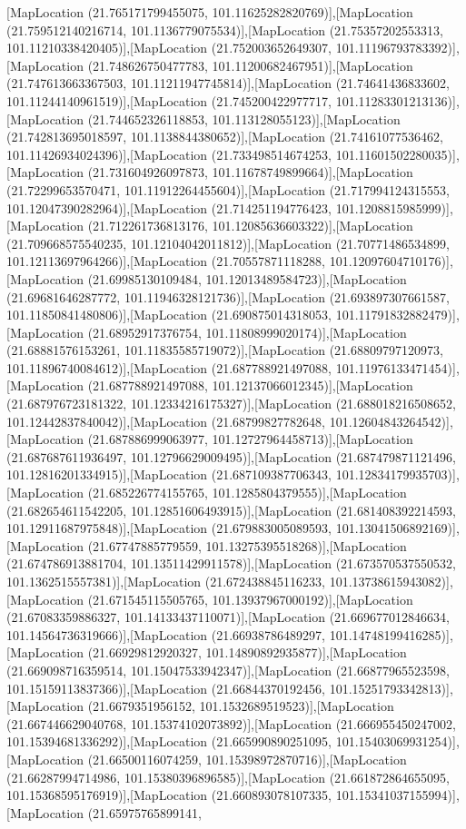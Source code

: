 [MapLocation (21.765171799455075, 101.11625282820769)],[MapLocation (21.759512140216714, 101.1136779075534)],[MapLocation (21.75357202553313, 101.11210338420405)],[MapLocation (21.752003652649307, 101.11196793783392)],[MapLocation (21.748626750477783, 101.11200682467951)],[MapLocation (21.747613663367503, 101.11211947745814)],[MapLocation (21.74641436833602, 101.11244140961519)],[MapLocation (21.745200422977717, 101.11283301213136)],[MapLocation (21.744652326118853, 101.113128055123)],[MapLocation (21.742813695018597, 101.1138844380652)],[MapLocation (21.74161077536462, 101.11426934024396)],[MapLocation (21.733498514674253, 101.11601502280035)],[MapLocation (21.731604926097873, 101.11678749899664)],[MapLocation (21.72299653570471, 101.11912264455604)],[MapLocation (21.717994124315553, 101.12047390282964)],[MapLocation (21.714251194776423, 101.1208815985999)],[MapLocation (21.712261736813176, 101.12085636603322)],[MapLocation (21.709668575540235, 101.12104042011812)],[MapLocation (21.70771486534899, 101.12113697964266)],[MapLocation (21.70557871118288, 101.12097604710176)],[MapLocation (21.69985130109484, 101.12013489584723)],[MapLocation (21.69681646287772, 101.11946328121736)],[MapLocation (21.693897307661587, 101.11850841480806)],[MapLocation (21.690875014318053, 101.11791832882479)],[MapLocation (21.68952917376754, 101.11808999020174)],[MapLocation (21.68881576153261, 101.11835585719072)],[MapLocation (21.68809797120973, 101.11896740084612)],[MapLocation (21.687788921497088, 101.11976133471454)],[MapLocation (21.687788921497088, 101.12137066012345)],[MapLocation (21.687976723181322, 101.12334216175327)],[MapLocation (21.688018216508652, 101.12442837840042)],[MapLocation (21.68799827782648, 101.12604843264542)],[MapLocation (21.687886999063977, 101.12727964458713)],[MapLocation (21.687687611936497, 101.12796629009495)],[MapLocation (21.687479871121496, 101.12816201334915)],[MapLocation (21.687109387706343, 101.12834179935703)],[MapLocation (21.685226774155765, 101.1285804379555)],[MapLocation (21.682654611542205, 101.12851606493915)],[MapLocation (21.681408392214593, 101.12911687975848)],[MapLocation (21.679883005089593, 101.13041506892169)],[MapLocation (21.67747885779559, 101.13275395518268)],[MapLocation (21.674786913881704, 101.13511429911578)],[MapLocation (21.673570537550532, 101.1362515557381)],[MapLocation (21.672438845116233, 101.13738615943082)],[MapLocation (21.671545115505765, 101.13937967000192)],[MapLocation (21.67083359886327, 101.14133437110071)],[MapLocation (21.669677012846634, 101.14564736319666)],[MapLocation (21.66938786489297, 101.14748199416285)],[MapLocation (21.66929812920327, 101.14890892935877)],[MapLocation (21.669098716359514, 101.15047533942347)],[MapLocation (21.66877965523598, 101.15159113837366)],[MapLocation (21.66844370192456, 101.15251793342813)],[MapLocation (21.6679351956152, 101.1532689519523)],[MapLocation (21.667446629040768, 101.15374102073892)],[MapLocation (21.666955450247002, 101.15394681336292)],[MapLocation (21.665990890251095, 101.15403069931254)],[MapLocation (21.66500116074259, 101.15398972870716)],[MapLocation (21.66287994714986, 101.15380396896585)],[MapLocation (21.661872864655095, 101.15368595176919)],[MapLocation (21.660893078107335, 101.15341037155994)],[MapLocation (21.65975765899141, 